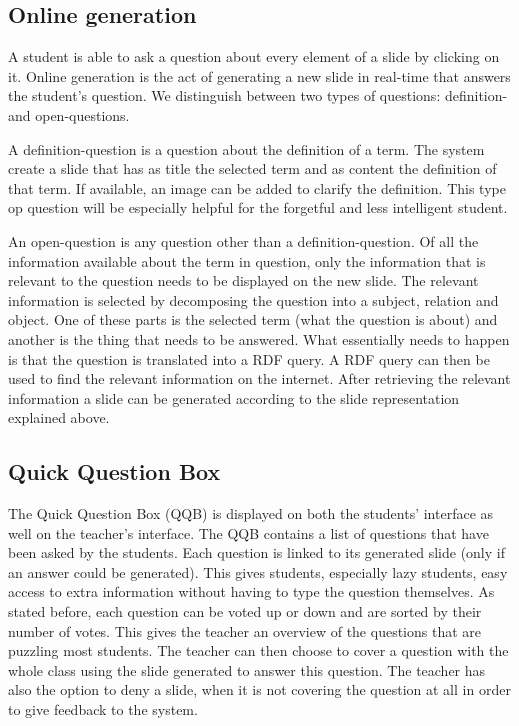 \documentclass[11pt]{article}
\begin{document}
\subsection{Online generation}
A student is able to ask a question about every element of a slide by clicking on it. Online generation is the act of generating a new slide in real-time that answers the student's question. We distinguish between two types of questions: definition- and open-questions.

A definition-question is a question about the definition of a term. The system create a slide that has as title the selected term and as content the definition of that term. If available, an image can be added to clarify the definition. This type op question will be especially helpful for the forgetful and less intelligent student. 

An open-question is any question other than a definition-question. Of all the information available about the term in question, only the information that is relevant to the question needs to be displayed on the new slide. The relevant information is selected by decomposing the question into a subject, relation and object. One of these parts is the selected term (what the question is about) and another is the thing that needs to be answered. What essentially needs to happen is that the question is translated into a RDF query. A RDF query can then be used to find the relevant information on the internet. After retrieving the relevant information a slide can be generated according to the slide representation explained above.

\subsection{Quick Question Box}
The Quick Question Box (QQB) is displayed on both the students’ interface as well on the teacher's interface. The QQB contains a list of questions that have been asked by the students. Each question is linked to its generated slide (only if an answer could be generated). This gives students, especially lazy students, easy access to extra information without having to type the question themselves. As stated before, each question can be voted up or down and are sorted by their number of votes. This gives the teacher an overview of the questions that are puzzling most students. The teacher can then choose to cover a question with the whole class using the slide generated to answer this question. The teacher has also the option to deny a slide, when it is not covering the question at all in order to give feedback to the system.
\end{document}
